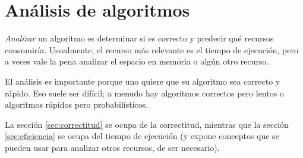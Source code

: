 \section{Análisis de algoritmos}

\emph{Analizar} un algoritmo es determinar si es correcto y predecir qué recursos consumiría. Usualmente, el recurso más relevante es el tiempo de ejecución, pero a veces vale la pena analizar el espacio en memoria o algún otro recurso.

El análisis es importante porque uno quiere que su algoritmo sea correcto y rápido. Eso suele ser difícil; a menudo hay algoritmos correctos pero lentos o algoritmos rápidos pero probabilísticos.

La sección \ref{sec:correctitud} se ocupa de la correctitud, mientras que la sección \ref{sec:eficiencia} se ocupa del tiempo de ejecución (y expone conceptos que se pueden usar para analizar otros recursos, de ser necesario).


